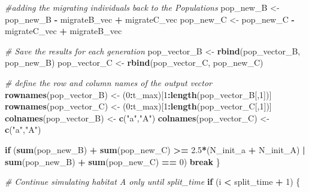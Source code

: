 \documentclass[
]{article}
\newenvironment{Shaded}{\begin{snugshade}}{\end{snugshade}}
\newcommand{\CommentTok}[1]{\textcolor[rgb]{0.56,0.35,0.01}{\textit{#1}}}
\newcommand{\ControlFlowTok}[1]{\textcolor[rgb]{0.13,0.29,0.53}{\textbf{#1}}}
\newcommand{\DecValTok}[1]{\textcolor[rgb]{0.00,0.00,0.81}{#1}}
\newcommand{\FloatTok}[1]{\textcolor[rgb]{0.00,0.00,0.81}{#1}}
\newcommand{\FunctionTok}[1]{\textcolor[rgb]{0.13,0.29,0.53}{\textbf{#1}}}
\newcommand{\NormalTok}[1]{#1}
\newcommand{\OtherTok}[1]{\textcolor[rgb]{0.56,0.35,0.01}{#1}}
\newcommand{\SpecialCharTok}[1]{\textcolor[rgb]{0.81,0.36,0.00}{\textbf{#1}}}
\newcommand{\StringTok}[1]{\textcolor[rgb]{0.31,0.60,0.02}{#1}}
\begin{document}
\begin{Shaded}
\begin{Highlighting}[]
      \CommentTok{\#adding the migrating individuals back to the Populations}
\NormalTok{      pop\_new\_B }\OtherTok{\textless{}{-}}\NormalTok{ pop\_new\_B }\SpecialCharTok{{-}}\NormalTok{ migrateB\_vec }\SpecialCharTok{+}\NormalTok{ migrateC\_vec}
\NormalTok{      pop\_new\_C }\OtherTok{\textless{}{-}}\NormalTok{ pop\_new\_C }\SpecialCharTok{{-}}\NormalTok{ migrateC\_vec }\SpecialCharTok{+}\NormalTok{ migrateB\_vec}

      \CommentTok{\# Save the results for each generation}
\NormalTok{      pop\_vector\_B }\OtherTok{\textless{}{-}} \FunctionTok{rbind}\NormalTok{(pop\_vector\_B, pop\_new\_B)}
\NormalTok{      pop\_vector\_C }\OtherTok{\textless{}{-}} \FunctionTok{rbind}\NormalTok{(pop\_vector\_C, pop\_new\_C)}
      
      \CommentTok{\# define the row and column names of the output vector}
      \FunctionTok{rownames}\NormalTok{(pop\_vector\_B) }\OtherTok{\textless{}{-}}\NormalTok{ (}\DecValTok{0}\SpecialCharTok{:}\NormalTok{t\_max)[}\DecValTok{1}\SpecialCharTok{:}\FunctionTok{length}\NormalTok{(pop\_vector\_B[,}\DecValTok{1}\NormalTok{])] }
      \FunctionTok{rownames}\NormalTok{(pop\_vector\_C) }\OtherTok{\textless{}{-}}\NormalTok{ (}\DecValTok{0}\SpecialCharTok{:}\NormalTok{t\_max)[}\DecValTok{1}\SpecialCharTok{:}\FunctionTok{length}\NormalTok{(pop\_vector\_C[,}\DecValTok{1}\NormalTok{])]}
      \FunctionTok{colnames}\NormalTok{(pop\_vector\_B) }\OtherTok{\textless{}{-}} \FunctionTok{c}\NormalTok{(}\StringTok{"a"}\NormalTok{,}\StringTok{"A"}\NormalTok{)}
      \FunctionTok{colnames}\NormalTok{(pop\_vector\_C) }\OtherTok{\textless{}{-}} \FunctionTok{c}\NormalTok{(}\StringTok{"a"}\NormalTok{,}\StringTok{"A"}\NormalTok{)}
      
      \ControlFlowTok{if}\NormalTok{ (}\FunctionTok{sum}\NormalTok{(pop\_new\_B) }\SpecialCharTok{+} \FunctionTok{sum}\NormalTok{(pop\_new\_C) }\SpecialCharTok{\textgreater{}=} \FloatTok{2.5}\SpecialCharTok{*}\NormalTok{(N\_init\_a }\SpecialCharTok{+}\NormalTok{ N\_init\_A) }\SpecialCharTok{|}
          \FunctionTok{sum}\NormalTok{(pop\_new\_B) }\SpecialCharTok{+} \FunctionTok{sum}\NormalTok{(pop\_new\_C) }\SpecialCharTok{==} \DecValTok{0}\NormalTok{) }\ControlFlowTok{break}
\NormalTok{    \}}
    
    \CommentTok{\# Continue simulating habitat A only until split\_time}
    \ControlFlowTok{if}\NormalTok{ (i }\SpecialCharTok{\textless{}}\NormalTok{ split\_time }\SpecialCharTok{+} \DecValTok{1}\NormalTok{) \{}
      

\end{Highlighting}
\end{Shaded}
\end{document}
